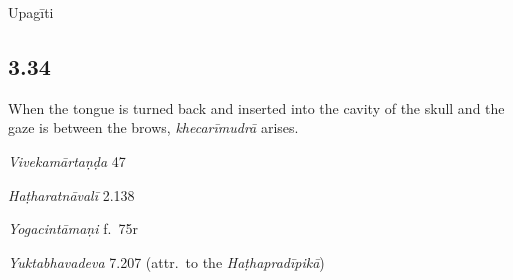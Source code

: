 \begin{ekdosis}
\begin{metre}[hp03_033]
Upagīti 
\end{metre}

\subsection*{3.34}
\begin{translation}[hp03_034]
When the tongue is turned back and inserted into the cavity of the skull and the gaze is between the brows, \emph{khecarīmudrā} arises.
\end{translation}

\begin{sources}[hp03_034]
\emph{Vivekamārtaṇḍa} 47
\begin{versinnote}
\end{versinnote}
\end{sources}

\begin{testimonia}[hp03_034]
\emph{Haṭharatnāvalī} 2.138
\begin{versinnote}
\end{versinnote}

\emph{Yogacintāmaṇi} f.~75r
\begin{versinnote}
\end{versinnote}

\emph{Yuktabhavadeva} 7.207 (attr.~to the \emph{Haṭhapradīpikā})
\begin{versinnote}
\end{versinnote}
\end{testimonia}


\end{ekdosis}
